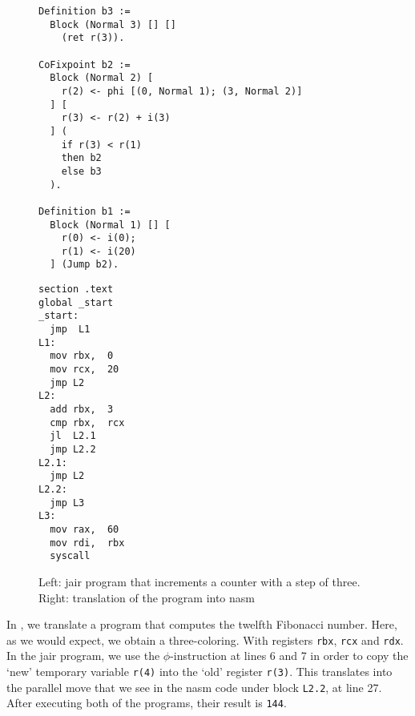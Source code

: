 \begin{figure}[ht]
\begin{minipage}{0.68\linewidth}
\centering
\begin{lstlisting}[style=Rocq]
Definition b3 :=
  Block (Normal 3) [] []
    (ret r(3)).

CoFixpoint b2 :=
  Block (Normal 2) [
    r(2) <- phi [(0, Normal 1); (3, Normal 2)]
  ] [
    r(3) <- r(2) + i(3)
  ] (
    if r(3) < r(1)
    then b2
    else b3
  ).

Definition b1 :=
  Block (Normal 1) [] [
    r(0) <- i(0);
    r(1) <- i(20)
  ] (Jump b2).
\end{lstlisting}
\end{minipage}
\hfill
\begin{minipage}{0.28\linewidth}
\centering
\begin{lstlisting}[style=NASM]
section .text
global _start
_start:
  jmp  L1
L1:
  mov rbx,  0
  mov rcx,  20
  jmp L2
L2:
  add rbx,  3
  cmp rbx,  rcx
  jl  L2.1
  jmp L2.2
L2.1:
  jmp L2
L2.2:
  jmp L3
L3:
  mov rax,  60
  mov rdi,  rbx
  syscall
\end{lstlisting}
\end{minipage}
\caption{Left: \gls{jair} program that increments a counter with a step of three. Right: translation of the program into \gls{nasm}}
\label{fig:ex2}
\end{figure}

In , we translate a program that computes the twelfth Fibonacci number. Here, as we would expect, we obtain a three-coloring. With registers \texttt{rbx}, \texttt{rcx} and \texttt{rdx}. In the \gls{jair} program, we use the $\phi$-instruction at lines 6 and 7 in order to copy the `new' temporary variable \texttt{r(4)} into the `old' register \texttt{r(3)}. This translates into the parallel move that we see in the \gls{nasm} code under block \texttt{L2.2}, at line 27. After executing both of the programs, their result is \texttt{144}.

